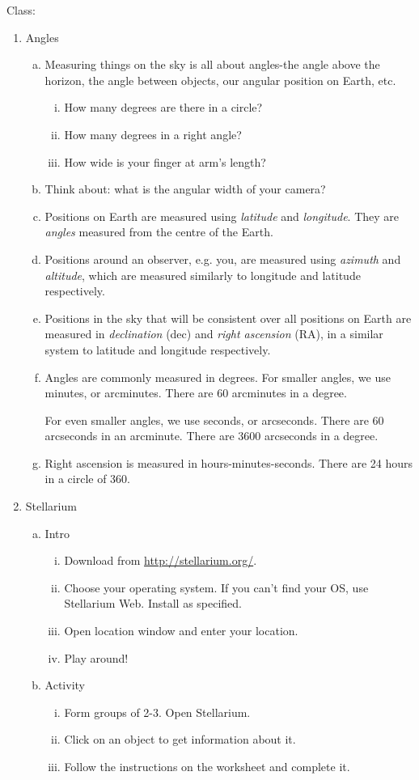 \documentclass[12pt]{article}
\begin{document}
\noindent
Class:
\begin{enumerate}
\item Angles
	\begin{enumerate}[a.]
	\item Measuring things on the sky is all about angles-the angle above the horizon, the angle between objects, our angular position on Earth, etc.
		\begin{enumerate}[i.]
		\item How many degrees are there in a circle? 
		\item How many degrees in a right angle? 
		\item How wide is your finger at arm's length? 
		\end{enumerate}
	\item Think about: what is the angular width of your camera?
	\item Positions on Earth are measured using \emph{latitude} and \emph{longitude}. They are \emph{angles} measured from the centre of the Earth.
	\item Positions around an observer, e.g. you, are measured using \emph{azimuth} and \emph{altitude}, which are measured similarly to longitude and latitude respectively.
	\item Positions in the sky that will be consistent over all positions on Earth are measured in \emph{declination} (dec) and \emph{right ascension} (RA), in a similar system to latitude and longitude respectively.
	\item Angles are commonly measured in degrees. For smaller angles, we use minutes, or arcminutes. There are 60 arcminutes in a degree. 

For even smaller angles, we use seconds, or arcseconds. There are 60 arcseconds in an arcminute. There are 3600 arcseconds in a degree. 
	\item Right ascension is measured in hours-minutes-seconds. There are 24 hours in a circle of 360. 
	\end{enumerate}
\item Stellarium
	\begin{enumerate}[a.]
	\item Intro
		\begin{enumerate}[i.]
		\item Download from \url{http://stellarium.org/}.
		\item Choose your operating system. If you can't find your OS, use Stellarium Web. Install as specified.
		\item Open location window and enter your location.
		\item Play around!
		\end{enumerate}
	\item Activity
		\begin{enumerate}[i.]
		\item Form groups of 2-3. Open Stellarium.
		\item Click on an object to get information about it.
		\item Follow the instructions on the worksheet and complete it.
		\end{enumerate}
	\end{enumerate}
\end{enumerate}
\end{document}

